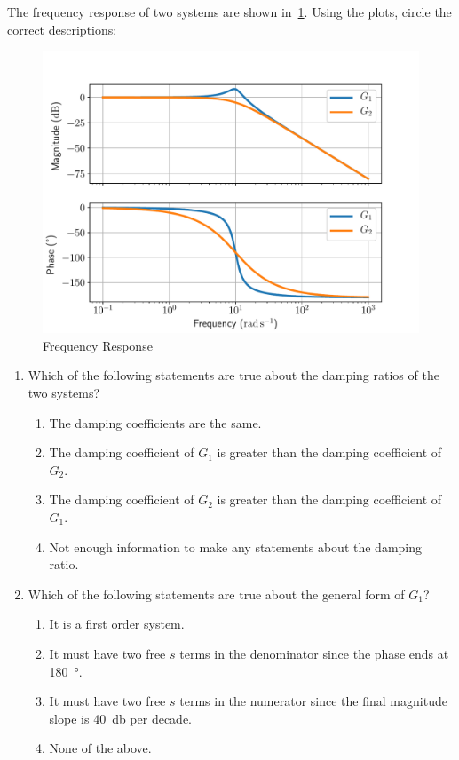 \documentclass[11pt, reqno]{article}    %
\begin{document}
The frequency response of two systems are shown in~\cref{fig:prob1_bode}.
Using the plots, circle the correct descriptions:
\begin{figure}[htbp]
    \centering
    \includegraphics[width=\textwidth, height=0.6\textheight, keepaspectratio]{figures/prob1_bode.pdf}
    \caption{Frequency Response~\label{fig:prob1_bode}}
\end{figure}  

\begin{enumerate}
    \item Which of the following statements are true about the damping ratios of the two systems?
    \begin{enumerate}
        \item The damping coefficients are the same.
        \item The damping coefficient of \(G_1\) is greater than the damping coefficient of \(G_2\).
        \item The damping coefficient of \(G_2\) is greater than the damping coefficient of \(G_1\).
        \item Not enough information to make any statements about the damping ratio.
    \end{enumerate} 
    \item Which of the following statements are true about the general form of \(G_1\)?
    \begin{enumerate}
        \item It is a first order system.
        \item It must have two free \(s\) terms in the denominator since the phase ends at \SI{180}{\degree}.
        \item It must have two free \(s\) terms in the numerator since the final magnitude slope is \SI{40}{\decibel} per decade.
        \item None of the above.
    \end{enumerate}
\end{enumerate}
\clearpage
\end{document}
